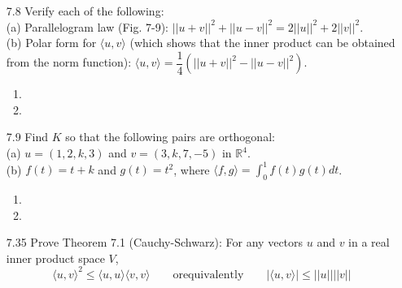 \documentclass[12pt]{article}
\theoremstyle{definition}
\theoremstyle{plain}
\begin{document}
\begin{enumerate}
	\begin{enumerate}
	\item
	\end{enumerate}		
\item[7.8]Verify each of the following:\\
(a) Parallelogram law (Fig. 7-9): $||u+v||^2 + ||u-v||^2 = 2||u||^2 + 2||v||^2$.\\
(b) Polar form for $\langle u,v \rangle$ (which shows that the inner product can be obtained from the norm function): $\langle u,v\rangle=\dfrac{1}{4}(||u+v||^2-||u-v||^2)$.
	\begin{enumerate}
	\item
	\item
	\end{enumerate}
\item[7.9]Find $K$ so that the following pairs are orthogonal:\\
(a) $u=(1,2,k,3)$ and $v=(3,k,7,-5)$ in $\mathbb{R}^4$.\\
(b) $f(t) = t+k$ and $g(t)=t^2$, where $\langle f,g\rangle = \int_0^1f(t)g(t)dt$.
	\begin{enumerate}
	\item
	\item
	\end{enumerate}
\item[7.35]Prove Theorem 7.1 (Cauchy-Schwarz): For any vectors $u$ and $v$ in a real inner product space $V$,
\[ \langle u,v \rangle^2 \leq \langle u,u\rangle \langle v,v\rangle \qquad \mathrm{or equivalently} \qquad |\langle u,v \rangle | \leq ||u|| ||v|| \]


\end{enumerate}
\end{document}
